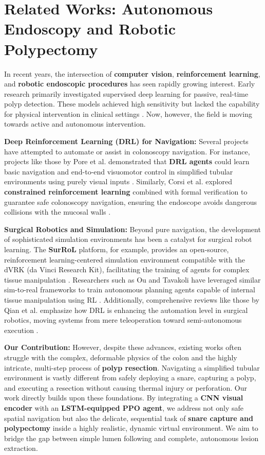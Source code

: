\section{Related Works: Autonomous Endoscopy and Robotic Polypectomy}
\label{sec:related_works}

In recent years, the intersection of \textbf{computer vision}, \textbf{reinforcement learning}, and \textbf{robotic endoscopic procedures} has seen rapidly growing interest. Early research primarily investigated supervised deep learning for passive, real-time polyp detection. These models achieved high sensitivity but lacked the capability for physical intervention in clinical settings \cite{wang2019cade,repici2020cade,nazarian2021jmir}. Now, however, the field is moving towards active and autonomous intervention.

\textbf{Deep Reinforcement Learning (DRL) for Navigation:}
Several projects have attempted to automate or assist in colonoscopy navigation. For instance, projects like those by Pore et al. demonstrated that \textbf{DRL agents} could learn basic navigation and end-to-end visuomotor control in simplified tubular environments using purely visual inputs \cite{pore2022iros}. Similarly, Corsi et al. explored \textbf{constrained reinforcement learning} combined with formal verification to guarantee safe colonoscopy navigation, ensuring the endoscope avoids dangerous collisions with the mucosal walls \cite{corsi2023arxiv}. 

\textbf{Surgical Robotics and Simulation:}
Beyond pure navigation, the development of sophisticated simulation environments has been a catalyst for surgical robot learning. The \textbf{SurRoL} platform, for example, provides an open-source, reinforcement learning-centered simulation environment compatible with the dVRK (da Vinci Research Kit), facilitating the training of agents for complex tissue manipulation \cite{surrol2021arxiv}. Researchers such as Ou and Tavakoli have leveraged similar sim-to-real frameworks to train autonomous planning agents capable of internal tissue manipulation using RL \cite{ou2023lra}. Additionally, comprehensive reviews like those by Qian et al. emphasize how DRL is enhancing the automation level in surgical robotics, moving systems from mere teleoperation toward semi-autonomous execution \cite{qian2023arxiv}.

\textbf{Our Contribution:}
However, despite these advances, existing works often struggle with the complex, deformable physics of the colon and the highly intricate, multi-step process of \textbf{polyp resection}. Navigating a simplified tubular environment is vastly different from safely deploying a snare, capturing a polyp, and executing a resection without causing thermal injury or perforation. Our work directly builds upon these foundations. By integrating a \textbf{CNN visual encoder} with an \textbf{LSTM-equipped PPO agent}, we address not only safe spatial navigation but also the delicate, sequential task of \textbf{snare capture and polypectomy} inside a highly realistic, dynamic virtual environment. We aim to bridge the gap between simple lumen following and complete, autonomous lesion extraction.
